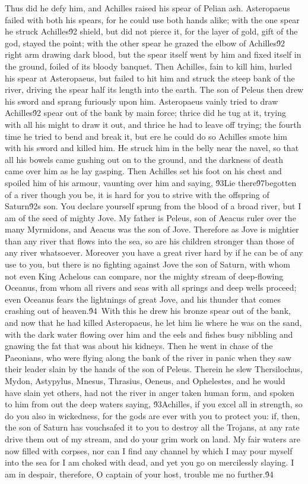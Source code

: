 {Thus did he defy him, and Achilles raised his spear of Pelian ash. Asteropaeus failed with both his spears, for he could use both hands alike; with the one spear he struck Achilles\'92 shield, but did not pierce it, for the layer of gold, gift of the god, stayed the point; with the other spear he grazed the elbow of Achilles\'92 right arm drawing dark blood, but the spear itself went by him and fixed itself in the ground, foiled of its bloody banquet. Then Achilles, fain to kill him, hurled his spear at Asteropaeus, but failed to hit him and struck the steep bank of the river, driving the spear half its length into the earth. The son of Peleus then drew his sword and sprang furiously upon him. Asteropaeus vainly tried to draw Achilles\'92 spear out of the bank by main force; thrice did he tug at it, trying with all his might to draw it out, and thrice he had to leave off trying; the fourth time he tried to bend and break it, but ere he could do so Achilles smote him with his sword and killed him. He struck him in the belly near the navel, so that all his bowels came gushing out on to the ground, and the darkness of death came over him as he lay gasping. Then Achilles set his foot on his chest and spoiled him of his armour, vaunting over him and saying, \'93Lie there\'97begotten of a river though you be, it is hard for you to strive with the offspring of Saturn\'92s son. You declare yourself sprung from the blood of a broad river, but I am of the seed of mighty Jove. My father is Peleus, son of Aeacus ruler over the many Myrmidons, and Aeacus was the son of Jove. Therefore as Jove is mightier than any river that flows into the sea, so are his children stronger than those of any river whatsoever. Moreover you have a great river hard by if he can be of any use to you, but there is no fighting against Jove the son of Saturn, with whom not even King Achelous can compare, nor the mighty stream of deep-flowing Oceanus, from whom all rivers and seas with all springs and deep wells proceed; even Oceanus fears the lightnings of great Jove, and his thunder that comes crashing out of heaven.\'94\
With this he drew his bronze spear out of the bank, and now that he had killed Asteropaeus, he let him lie where he was on the sand, with the dark water flowing over him and the eels and fishes busy nibbling and gnawing the fat that was about his kidneys. Then he went in chase of the Paeonians, who were flying along the bank of the river in panic when they saw their leader slain by the hands of the son of Peleus. Therein he slew Thersilochus, Mydon, Astypylus, Mnesus, Thrasius, Oeneus, and Ophelestes, and he would have slain yet others, had not the river in anger taken human form, and spoken to him from out the deep waters saying, \'93Achilles, if you excel all in strength, so do you also in wickedness, for the gods are ever with you to protect you: if, then, the son of Saturn has vouchsafed it to you to destroy all the Trojans, at any rate drive them out of my stream, and do your grim work on land. My fair waters are now filled with corpses, nor can I find any channel by which I may pour myself into the sea for I am choked with dead, and yet you go on mercilessly slaying. I am in despair, therefore, O captain of your host, trouble me no further.\'94\
}
